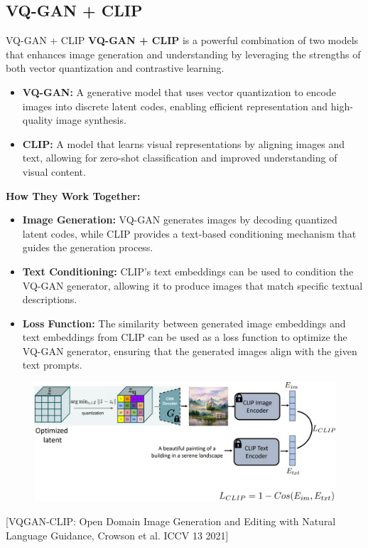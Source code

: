\subsection{VQ-GAN + CLIP}
\begin{frame}[allowframebreaks]{VQ-GAN + CLIP}
    \large
    \textbf{VQ-GAN + CLIP} is a powerful combination of two models that enhances image generation and understanding by leveraging the strengths of both vector quantization and contrastive learning.

    \begin{itemize}
        \item \textbf{VQ-GAN:} A generative model that uses vector quantization to encode images into discrete latent codes, enabling efficient representation and high-quality image synthesis.
        \item \textbf{CLIP:} A model that learns visual representations by aligning images and text, allowing for zero-shot classification and improved understanding of visual content.
    \end{itemize}
\framebreak
    \textbf{How They Work Together:}
    \begin{itemize}
        \item \textbf{Image Generation:} VQ-GAN generates images by decoding quantized latent codes, while CLIP provides a text-based conditioning mechanism that guides the generation process.
        \item \textbf{Text Conditioning:} CLIP's text embeddings can be used to condition the VQ-GAN generator, allowing it to produce images that match specific textual descriptions.
        \item \textbf{Loss Function:} The similarity between generated image embeddings and text embeddings from CLIP can be used as a loss function to optimize the VQ-GAN generator, ensuring that the generated images align with the given text prompts.
    \end{itemize}
\framebreak
    \begin{figure}
        \centering
        \includegraphics[width=1\textwidth,height=0.8\textheight,keepaspectratio]{images/video/slide_60_1_img.jpg}
    \end{figure}
    {\footnotesize{[VQGAN-CLIP: Open Domain Image Generation and Editing with Natural Language Guidance, Crowson et al. ICCV 13 2021]}}


\end{frame}
